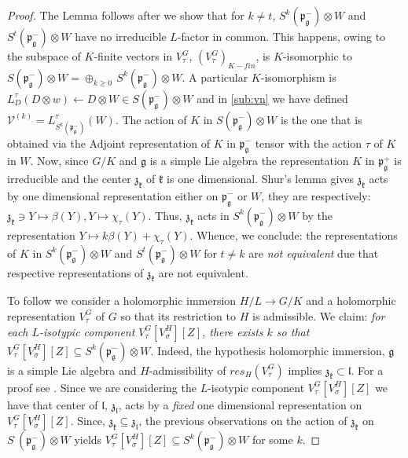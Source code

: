 \documentclass[12pt]{amsart}
\theoremstyle{definition}
\theoremstyle{remark}
\newcommand{\g}{\mathfrak{g}}
\renewcommand{\k}{{\mathfrak k}}
\renewcommand{\l}{\mathfrak l}
\newcommand{\p}{\mathfrak p}
\newcommand{\z}{\mathfrak z}
\numberwithin{equation}{section}
\begin{document}
 \begin{proof} The Lemma follows after we show that for $k \not= t$,  $S^k(\p_\g^-)\otimes W$   and  $S^t(\p_\g^-)\otimes W$ have no irreducible $L$-factor in common. This happens, owing to the subspace of $K$-finite vectors in $V_\tau^G$, $(V_\tau^G)_{K-fin}$, is $K$-isomorphic to $S(\p_\g^-)\otimes W=\oplus_{k\geq 0} \, S^k(\p_\g^-)\otimes W$. A particular  $K$-isomorphism is $L_D^\tau (D\otimes w)\leftarrow D\otimes W \in S(\p_\g^-)\otimes W$ and in \ref{sub:vn} we have defined  $\mathcal V^{(k)}= L_{S^k(\p_\g^-)}^\tau(W)$. The action of $K$ in $S(\p_\g^-)\otimes W$ is
 the one that is obtained via the Adjoint representation of $K$ in $\p_\g^-$ tensor with the action $\tau$ of $K$ in $W$. Now, since $G/K$ and $\g$ is a simple Lie algebra the representation $K$ in $\p_\g^+$ is irreducible and the center $\z_\k$ of $\k$ is one dimensional. Shur's lemma gives  $\z_\k$ acts by one dimensional representation either on $\p_\g^-$ or $W$, they are respectively: $\z_\k \ni Y \mapsto \beta (Y), Y \mapsto \chi_\tau (Y)$. Thus, $\z_\k $ acts in $S^k(\p_\g^-)\otimes W$ by the representation $Y \mapsto k\beta (Y)+ \chi_\tau (Y)$. Whence, we conclude: the representations of $K$ in  $S^k(\p_\g^-)\otimes W$ and  $S^t(\p_\g^-)\otimes W$ for $t\not= k$ are {\it not   equivalent} due that respective representations of $\z_\k$ are not equivalent.

 To follow we consider a holomorphic immersion $H/L \rightarrow G/K$ and a holomorphic representation $V_\tau^G$ of $G$ so that its restriction to $H$ is admissible. We claim: {\it for each $L$-isotypic component $V_\tau^G [V_\sigma^H][Z]$, there exists $k$ so that $V_\tau^G [V_\sigma^H][Z]\subseteq S^k(\p_\g^-)\otimes W$}. Indeed, the hypothesis holomorphic immersion, $\g$ is a simple Lie algebra and $H$-admissibility of $res_H(V_\tau^G) $ implies $\z_\k \subset \l $. For a proof see \cite[Table 2.1.3]{Kob9}. Since we are considering the $L$-isotypic component $V_\tau^G [V_\sigma^H][Z]$ we have that center of $\l$, $\z_\l$, acts by  a {\it fixed} one dimensional representation   on $V_\tau^G [V_\sigma^H][Z]$. Since, $\z_\k \subseteq \z_\l$, the previous observations on the action of $\z_\k$ on $S^\cdot(\p_\g^-)\otimes W$ yields $V_\tau^G [V_\sigma^H][Z]\subseteq S^k(\p_\g^-)\otimes W$ for some $k$. \end{proof}
\end{document}
